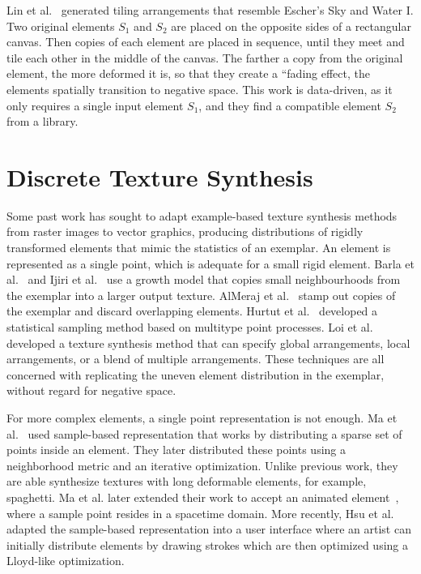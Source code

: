 Lin et al.~\cite{Lin2018} generated tiling arrangements that resemble Escher's Sky and Water I.
Two original elements $S_1$ and $S_2$ are placed on the opposite sides of a rectangular canvas.
Then copies of each element are placed in sequence, 
until they meet and tile each other in the middle of the canvas.
The farther a copy from the original element, the more deformed it is, so that they
create a ``fading effect, the elements spatially transition to negative space.
This work is data-driven, as it only requires a single input element $S_1$, 
and they find a compatible element $S_2$ from a library.


\section{Discrete Texture Synthesis}
Some past work has sought to adapt example-based texture synthesis methods
from raster images to vector graphics, producing distributions of
rigidly transformed elements that mimic the statistics of an exemplar.
An element is represented as a single point, which is adequate for a small rigid element.
Barla et al.~\cite{Barla2006} and Ijiri et al.~\cite{Ijiri2008} use a growth model that copies small neighbourhoods
from the exemplar into a larger output texture.  AlMeraj et al.~\cite{AlMeraj2013}
stamp out copies of the exemplar and discard overlapping elements.
Hurtut et al.~\cite{Hurtut2009} developed a statistical sampling method based
on multitype point processes.  
Loi et al.~\cite{Loi2017} developed a texture synthesis method that
can specify global arrangements, local arrangements, or a blend of multiple arrangements.
These techniques are all concerned with replicating
the uneven element distribution in the exemplar, without regard for negative space.

For more complex elements, a single point representation is not enough.
Ma et al.~\cite{Ma2011} used sample-based representation 
that works by distributing a sparse set of points inside an element.
They later distributed these points using a neighborhood metric and an iterative optimization.
Unlike previous work, they are able synthesize textures with long deformable elements, for example, spaghetti.
Ma et al. later extended their work to accept an animated element~\cite{Ma2013}, where
a sample point resides in a spacetime domain.
More recently, Hsu et al.~\cite{Hsu2020} adapted the sample-based representation into a user interface
where an artist can initially distribute elements by drawing strokes
which are then optimized using a Lloyd-like optimization.

